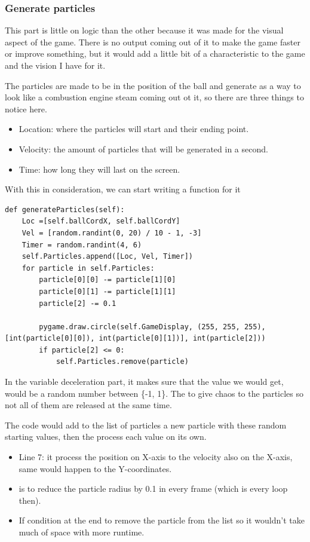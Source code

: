 \subsubsection{Generate particles}\label{generate-particles}
This part is little on logic than the other because it was made for the visual aspect of the game. There is no output coming out of it to make the game faster or improve something, but it would add a little bit of a characteristic to the game and the vision I have for it.

The particles are made to be in the position of the ball and generate as a way to look like a combustion engine steam coming out ot it, so there are three things to notice here.
\begin{itemize}
\item Location: where the particles will start and their ending point.
\item Velocity: the amount of particles that will be generated in a second.
\item Time: how long they will last on the screen.
\end{itemize}

With this in consideration, we can start writing a function for it 

\begin{listing}[H]
	\begin{verbatim}
def generateParticles(self):
	Loc =[self.ballCordX, self.ballCordY] 
	Vel = [random.randint(0, 20) / 10 - 1, -3]
	Timer = random.randint(4, 6)
	self.Particles.append([Loc, Vel, Timer])
	for particle in self.Particles:
		particle[0][0] -= particle[1][0]
		particle[0][1] -= particle[1][1]
		particle[2] -= 0.1
		
		pygame.draw.circle(self.GameDisplay, (255, 255, 255), [int(particle[0][0]), int(particle[0][1])], int(particle[2]))
		if particle[2] <= 0:
			self.Particles.remove(particle)
	\end{verbatim}
\end{listing}

In the  variable deceleration part, it makes sure that the value we would get, would be a random number between \{-1, 1\}. The  to give chaos to the particles so not all of them are released at the same time.

The code would add to the list of particles a new particle with these random starting values, then the  process each value on its own.

\begin{itemize}
\item Line 7: it process the position on X-axis to the velocity also on the X-axis, same would happen to the Y-coordinates.
\item {} is to reduce the particle radius by 0.1 in every frame (which is every loop then).
\item If condition at the end to remove the particle from the list so it wouldn't take much of space with more runtime.
\end{itemize}

